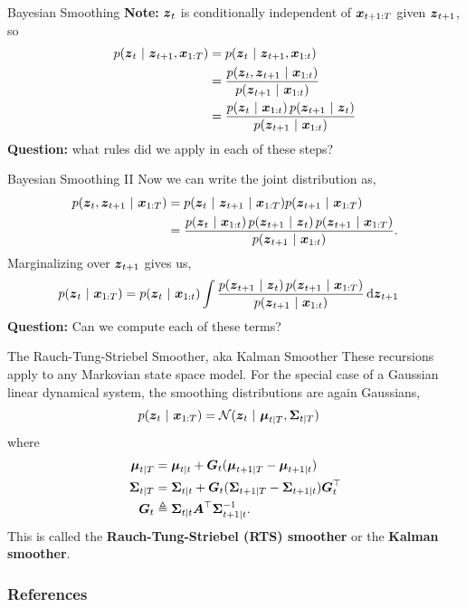 \documentclass[aspectratio=169]{beamer}
\begin{document}
\begin{frame}{Bayesian Smoothing}
        \textbf{Note:} $\boldsymbol{z}_t$ is conditionally independent of $\boldsymbol{x}_{t+1:T}$ given $\boldsymbol{z}_{t+1}$, so
        \begin{align}
            p(\boldsymbol{z}_t ~\vert~ \boldsymbol{z}_{t+1}, \boldsymbol{x}_{1:T}) 
            &= p(\boldsymbol{z}_t ~\vert~ \boldsymbol{z}_{t+1}, \boldsymbol{x}_{1:t}) \\
            &= \frac{p(\boldsymbol{z}_t, \boldsymbol{z}_{t+1} ~\vert~ \boldsymbol{x}_{1:t})}{p(\boldsymbol{z}_{t+1} ~\vert~ \boldsymbol{x}_{1:t})} \\
            &= \frac{p(\boldsymbol{z}_t ~\vert~ \boldsymbol{x}_{1:t}) \, p(\boldsymbol{z}_{t+1} ~\vert~ \boldsymbol{z}_t)}{p(\boldsymbol{z}_{t+1} ~\vert~ \boldsymbol{x}_{1:t})} 
        \end{align}
        \textbf{Question: } what rules did we apply in each of these steps?
\end{frame}
    
\begin{frame}{Bayesian Smoothing II}
    Now we can write the joint distribution as,
    \begin{align}
        p(\boldsymbol{z}_t, \boldsymbol{z}_{t+1} ~\vert~ \boldsymbol{x}_{1:T}) 
        &= p(\boldsymbol{z}_t ~\vert~ \boldsymbol{z}_{t+1} ~\vert~ \boldsymbol{x}_{1:T}) p(\boldsymbol{z}_{t+1} ~\vert~ \boldsymbol{x}_{1:T}) \\
        &= \frac{p(\boldsymbol{z}_t ~\vert~ \boldsymbol{x}_{1:t}) \, p(\boldsymbol{z}_{t+1} ~\vert~ \boldsymbol{z}_t) \,  p(\boldsymbol{z}_{t+1} ~\vert~ \boldsymbol{x}_{1:T})}{p(\boldsymbol{z}_{t+1} ~\vert~ \boldsymbol{x}_{1:t})}.
    \end{align}
    Marginalizing over $\boldsymbol{z}_{t+1}$ gives us,
    \begin{align}
        p(\boldsymbol{z}_t ~\vert~ \boldsymbol{x}_{1:T}) 
        &= p(\boldsymbol{z}_t ~\vert~ \boldsymbol{x}_{1:t}) \int \frac{p(\boldsymbol{z}_{t+1} ~\vert~ \boldsymbol{z}_t) \,  p(\boldsymbol{z}_{t+1} ~\vert~ \boldsymbol{x}_{1:T})}{p(\boldsymbol{z}_{t+1} ~\vert~ \boldsymbol{x}_{1:t})} \mathop{}\!\mathrm{d} \boldsymbol{z}_{t+1}
    \end{align}
    \textbf{Question:} Can we compute each of these terms?
\end{frame}
    
\begin{frame}{The Rauch-Tung-Striebel Smoother, aka Kalman Smoother}
    These recursions apply to any Markovian state space model. For the special case of a Gaussian linear dynamical system, the smoothing distributions are again Gaussians,
    \begin{align}
        p(\boldsymbol{z}_t ~\vert~ \boldsymbol{x}_{1:T}) 
        &= \mathcal{N}(\boldsymbol{z}_t ~\vert~ \boldsymbol{\mu}_{t|T}, \boldsymbol{\Sigma}_{t|T}) 
    \end{align}
    where
    \begin{align}
        \boldsymbol{\mu}_{t|T} &= \boldsymbol{\mu}_{t|t} + \boldsymbol{G}_t (\boldsymbol{\mu}_{t+1|T} - \boldsymbol{\mu}_{t+1|t}) \\
        \boldsymbol{\Sigma}_{t|T} &= \boldsymbol{\Sigma}_{t|t} + \boldsymbol{G}_t (\boldsymbol{\Sigma}_{t+1|T} - \boldsymbol{\Sigma}_{t+1|t}) \boldsymbol{G}_t^\top \\
        \boldsymbol{G}_t &\triangleq \boldsymbol{\Sigma}_{t|t} \boldsymbol{A}^\top \boldsymbol{\Sigma}_{t+1|t}^{-1}.
    \end{align}
    This is called the \textbf{Rauch-Tung-Striebel (RTS) smoother} or the \textbf{Kalman smoother}.
\end{frame}


\begin{frame}[t,allowframebreaks]
    \frametitle{References}
    
    
\end{frame}
\end{document}
